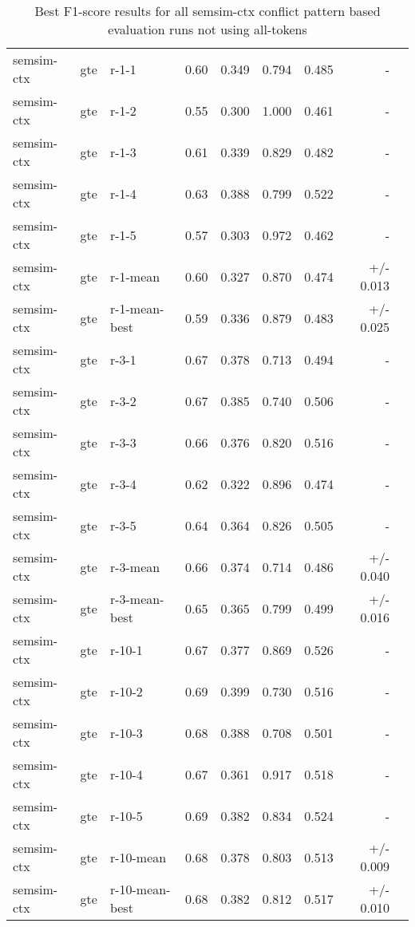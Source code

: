 \begin{table}[H]
\begin{tabular}{lllrrrrrr}
\hline
semsim-ctx & gte & r-1-1 & 0.60 & 0.349 & 0.794 & 0.485 & - \\
semsim-ctx & gte & r-1-2 & 0.55 & 0.300 & 1.000 & 0.461 & - \\
semsim-ctx & gte & r-1-3 & 0.61 & 0.339 & 0.829 & 0.482 & - \\
semsim-ctx & gte & r-1-4 & 0.63 & 0.388 & 0.799 & 0.522 & - \\
semsim-ctx & gte & r-1-5 & 0.57 & 0.303 & 0.972 & 0.462 & - \\
semsim-ctx & gte & r-1-mean & 0.60 & 0.327 & 0.870 & 0.474 & +/- 0.013 \\
semsim-ctx & gte & r-1-mean-best & 0.59 & 0.336 & 0.879 & 0.483 & +/- 0.025 \\
\hline
semsim-ctx & gte & r-3-1 & 0.67 & 0.378 & 0.713 & 0.494 & - \\
semsim-ctx & gte & r-3-2 & 0.67 & 0.385 & 0.740 & 0.506 & - \\
semsim-ctx & gte & r-3-3 & 0.66 & 0.376 & 0.820 & 0.516 & - \\
semsim-ctx & gte & r-3-4 & 0.62 & 0.322 & 0.896 & 0.474 & - \\
semsim-ctx & gte & r-3-5 & 0.64 & 0.364 & 0.826 & 0.505 & - \\
semsim-ctx & gte & r-3-mean & 0.66 & 0.374 & 0.714 & 0.486 & +/- 0.040 \\
semsim-ctx & gte & r-3-mean-best & 0.65 & 0.365 & 0.799 & 0.499 & +/- 0.016 \\
\hline
semsim-ctx & gte & r-10-1 & 0.67 & 0.377 & 0.869 & 0.526 & - \\
semsim-ctx & gte & r-10-2 & 0.69 & 0.399 & 0.730 & 0.516 & - \\
semsim-ctx & gte & r-10-3 & 0.68 & 0.388 & 0.708 & 0.501 & - \\
semsim-ctx & gte & r-10-4 & 0.67 & 0.361 & 0.917 & 0.518 & - \\
semsim-ctx & gte & r-10-5 & 0.69 & 0.382 & 0.834 & 0.524 & - \\
semsim-ctx & gte & r-10-mean & 0.68 & 0.378 & 0.803 & 0.513 & +/- 0.009 \\
semsim-ctx & gte & r-10-mean-best & 0.68 & 0.382 & 0.812 & 0.517 & +/- 0.010 \\
\bottomrule
\end{tabular}
\caption{Best F1-score results for all semsim-ctx conflict pattern based evaluation runs not using all-tokens}
\label{tab:quant-results-semsim-ctx}
\end{table}


